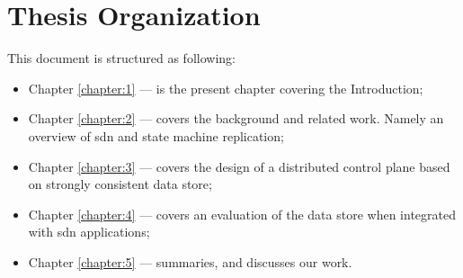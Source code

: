 \section{Thesis Organization}

This document is structured as following: 
\begin{itemize}
\item Chapter \ref{chapter:1} –-- is the present chapter covering the Introduction;
\item Chapter \ref{chapter:2} –-- covers the background and related work. Namely an overview of \gls{sdn} and state machine replication; 
\item Chapter \ref{chapter:3} --- covers the design of a distributed control plane based on strongly consistent data store; 
\item Chapter \ref{chapter:4} --- covers an evaluation of the data store when integrated with \gls{sdn} applications; 
\item Chapter \ref{chapter:5} --- summaries, and discusses our work.  
\end{itemize}

